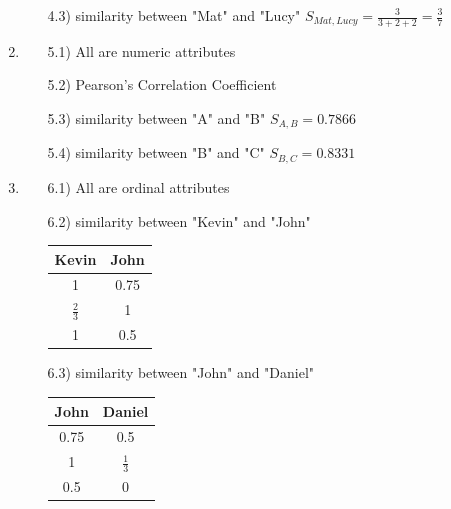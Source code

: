 \documentclass[12pt]{article}
\begin{document}
\begin{enumerate}[1.]
\begin{enumerate}
        \item[4.3)] similarity between "Mat" and "Lucy" \; $S_{Mat, Lucy} = \frac{3}{3+2+2} = \frac{3}{7} $
    \end{enumerate}

    \item \begin{enumerate}
        \item[5.1)] All are numeric attributes

        \item[5.2)] Pearson's Correlation Coefficient

        \item[5.3)] similarity between "A" and "B" \; $S_{A, B} = 0.7866$

        \item[5.4)] similarity between "B" and "C" \; $S_{B, C} = 0.8331$
    \end{enumerate}
    
\newpage

    \item \begin{enumerate}
        \item[6.1)] All are ordinal attributes

        \item[6.2)] similarity between "Kevin" and "John" \newline \\
        \begin{tabular}{|c|c|} \hline
            \textbf{Kevin} & \textbf{John} \\ \hline
            1 & 0.75 \\
            $\frac{2}{3}$ & 1 \\
            1 & 0.5 \\ \hline
        \end{tabular}

        \item[6.3)] similarity between "John" and "Daniel" \newline \\
        \begin{tabular}{|c|c|} \hline
            \textbf{John} & \textbf{Daniel} \\ \hline
            0.75 & 0.5 \\
            1 & $\frac{1}{3}$ \\
            0.5 & 0 \\ \hline
        \end{tabular}
        

\end{enumerate}
\end{enumerate}
\end{document}

